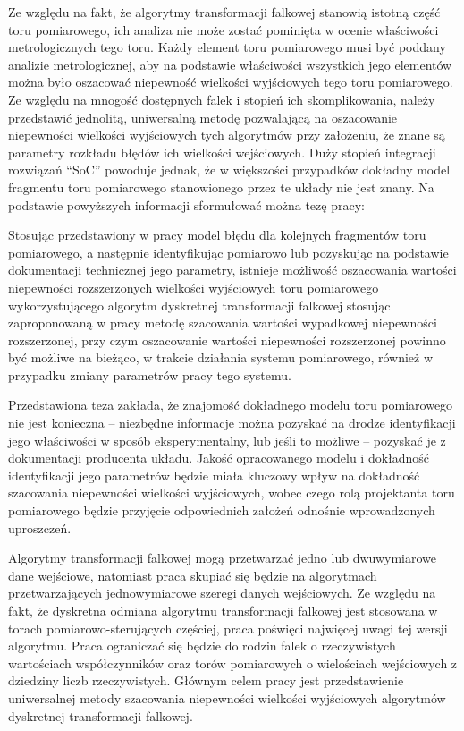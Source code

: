 Ze względu na fakt, że algorytmy transformacji falkowej stanowią istotną część toru pomiarowego, ich analiza nie może zostać pominięta w ocenie właściwości metrologicznych tego toru. Każdy element toru pomiarowego musi być poddany analizie metrologicznej, aby na podstawie właściwości wszystkich jego elementów można było oszacować niepewność wielkości wyjściowych tego toru pomiarowego. Ze względu na mnogość dostępnych falek i stopień ich skomplikowania, należy przedstawić jednolitą, uniwersalną metodę pozwalającą na oszacowanie niepewności wielkości wyjściowych tych algorytmów przy założeniu, że znane są parametry rozkładu błędów ich wielkości wejściowych. Duży stopień integracji rozwiązań \enquote{SoC} powoduje jednak, że w większości przypadków dokładny model fragmentu toru pomiarowego stanowionego przez te układy nie jest znany. Na podstawie powyższych informacji sformułować można tezę pracy:

\begin{quoting}[font = bfseries]
Stosując przedstawiony w pracy model błędu dla kolejnych fragmentów toru pomiarowego, a następnie identyfikując pomiarowo lub pozyskując na podstawie dokumentacji technicznej jego parametry, istnieje możliwość oszacowania wartości niepewności rozszerzonych wielkości wyjściowych toru pomiarowego wykorzystującego algorytm dyskretnej transformacji falkowej stosując zaproponowaną w pracy metodę szacowania wartości wypadkowej niepewności rozszerzonej, przy czym oszacowanie wartości niepewności rozszerzonej powinno być możliwe na bieżąco, w trakcie działania systemu pomiarowego, również w przypadku zmiany parametrów pracy tego systemu.
\end{quoting}

Przedstawiona teza zakłada, że znajomość dokładnego modelu toru pomiarowego nie jest konieczna -- niezbędne informacje można pozyskać na drodze identyfikacji jego właściwości w sposób eksperymentalny, lub jeśli to możliwe -- pozyskać je z dokumentacji producenta układu. Jakość opracowanego modelu i dokładność identyfikacji jego parametrów będzie miała kluczowy wpływ na dokładność szacowania niepewności wielkości wyjściowych, wobec czego rolą projektanta toru pomiarowego będzie przyjęcie odpowiednich założeń odnośnie wprowadzonych uproszczeń.

Algorytmy transformacji falkowej mogą przetwarzać jedno lub dwuwymiarowe dane wejściowe, natomiast praca skupiać się będzie na algorytmach przetwarzających jednowymiarowe szeregi danych wejściowych. Ze względu na fakt, że dyskretna odmiana algorytmu transformacji falkowej jest stosowana w torach pomiarowo-sterujących częściej, praca poświęci najwięcej uwagi tej wersji algorytmu. Praca ograniczać się będzie do rodzin falek o rzeczywistych wartościach współczynników oraz torów pomiarowych o wielościach wejściowych z dziedziny liczb rzeczywistych. Głównym celem pracy jest przedstawienie uniwersalnej metody szacowania niepewności wielkości wyjściowych algorytmów dyskretnej transformacji falkowej.

